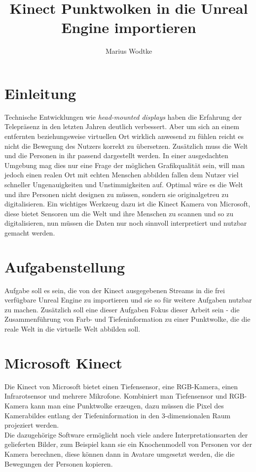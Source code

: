 \documentclass[cover]{isas-seminar}
\title{Kinect Punktwolken in die Unreal Engine importieren}
\author{Marius Wodtke}
\begin{document}
\maketitle

\begin{abstract}
\end{abstract}
\clearpage
\tableofcontents
\cleardoublepage

\section{Einleitung}
Technische Entwicklungen wie \textit{head-mounted displays} haben die Erfahrung der Telepräsenz in den letzten Jahren deutlich verbessert. Aber um sich an einem entfernten beziehungsweise virtuellen Ort wirklich anwesend zu fühlen reicht es nicht die Bewegung des Nutzers korrekt zu übersetzen. Zusätzlich muss die Welt und die Personen in ihr passend dargestellt werden. In einer ausgedachten Umgebung mag dies nur eine Frage der möglichen Grafikqualität sein, will man jedoch einen realen Ort mit echten Menschen abbilden fallen dem Nutzer viel schneller Ungenauigkeiten und Unstimmigkeiten auf. Optimal wäre es die Welt und ihre Personen nicht designen zu müssen, sondern sie originalgetreu zu digitalisieren. Ein wichtiges Werkzeug dazu ist die Kinect Kamera von Microsoft, diese bietet Sensoren um die Welt und ihre Menschen zu scannen und so zu digitalisieren, nun müssen die Daten nur noch sinnvoll interpretiert und nutzbar gemacht werden.

\section{Aufgabenstellung}
Aufgabe soll es sein, die von der Kinect ausgegebenen Streams in die frei verfügbare Unreal Engine zu importieren und sie so für weitere Aufgaben nutzbar zu machen. Zusätzlich soll eine dieser Aufgaben Fokus dieser Arbeit sein - die Zusammenführung von Farb- und Tiefeninformation zu einer Punktwolke, die die reale Welt in die virtuelle Welt abbilden soll. 

\section{Microsoft Kinect}
Die Kinect von Microsoft bietet einen Tiefensensor, eine RGB-Kamera, einen Infrarotsensor und mehrere Mikrofone. Kombiniert man Tiefensensor und RGB-Kamera kann man eine Punktwolke erzeugen, dazu müssen die Pixel des Kamerabildes entlang der Tiefeninformation in den 3-dimensionalen Raum projeziert werden. \\
Die dazugehörige Software ermöglicht noch viele andere Interpretationsarten der gelieferten Bilder, zum Beispiel kann sie ein Knochenmodell von Personen vor der Kamera berechnen, diese können dann in Avatare umgesetzt werden, die die Bewegungen der Personen kopieren.
\end{document}
